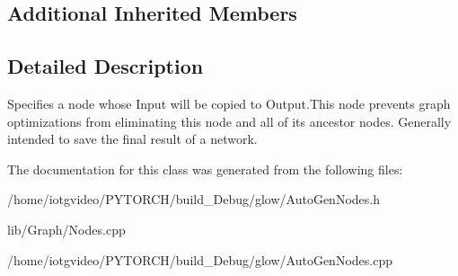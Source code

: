 \subsection*{Additional Inherited Members}


\subsection{Detailed Description}
Specifies a node whose Input will be copied to Output.\+This node prevents graph optimizations from eliminating this node and all of its ancestor nodes. Generally intended to save the final result of a network. 

The documentation for this class was generated from the following files\+:\begin{DoxyCompactItemize}
\item 
/home/iotgvideo/\+P\+Y\+T\+O\+R\+C\+H/build\+\_\+\+Debug/glow/Auto\+Gen\+Nodes.\+h\item 
lib/\+Graph/Nodes.\+cpp\item 
/home/iotgvideo/\+P\+Y\+T\+O\+R\+C\+H/build\+\_\+\+Debug/glow/Auto\+Gen\+Nodes.\+cpp\end{DoxyCompactItemize}
